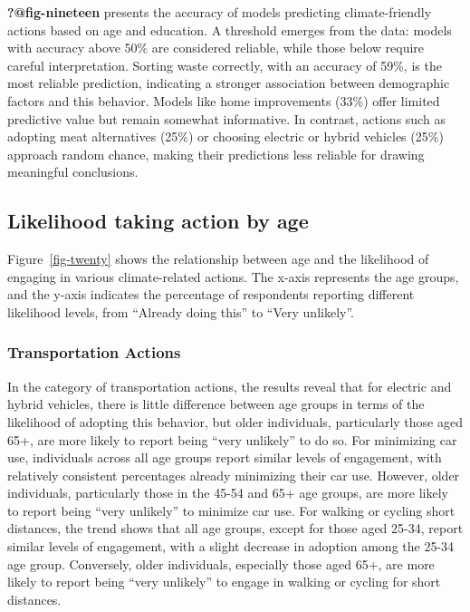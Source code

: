\documentclass[
  letterpaper,
  DIV=11,
  numbers=noendperiod]{scrartcl}
\begin{document}
\textbf{?@fig-nineteen} presents the accuracy of models predicting
climate-friendly actions based on age and education. A threshold emerges
from the data: models with accuracy above 50\% are considered reliable,
while those below require careful interpretation. Sorting waste
correctly, with an accuracy of 59\%, is the most reliable prediction,
indicating a stronger association between demographic factors and this
behavior. Models like home improvements (33\%) offer limited predictive
value but remain somewhat informative. In contrast, actions such as
adopting meat alternatives (25\%) or choosing electric or hybrid
vehicles (25\%) approach random chance, making their predictions less
reliable for drawing meaningful conclusions.

\subsection{Likelihood taking action by
age}\label{likelihood-taking-action-by-age}

Figure~\ref{fig-twenty} shows the relationship between age and the
likelihood of engaging in various climate-related actions. The x-axis
represents the age groups, and the y-axis indicates the percentage of
respondents reporting different likelihood levels, from ``Already doing
this'' to ``Very unlikely''.

\subsubsection{Transportation Actions}\label{transportation-actions-1}

In the category of transportation actions, the results reveal that for
electric and hybrid vehicles, there is little difference between age
groups in terms of the likelihood of adopting this behavior, but older
individuals, particularly those aged 65+, are more likely to report
being ``very unlikely'' to do so. For minimizing car use, individuals
across all age groups report similar levels of engagement, with
relatively consistent percentages already minimizing their car use.
However, older individuals, particularly those in the 45-54 and 65+ age
groups, are more likely to report being ``very unlikely'' to minimize
car use. For walking or cycling short distances, the trend shows that
all age groups, except for those aged 25-34, report similar levels of
engagement, with a slight decrease in adoption among the 25-34 age
group. Conversely, older individuals, especially those aged 65+, are
more likely to report being ``very unlikely'' to engage in walking or
cycling for short distances.
\end{document}
